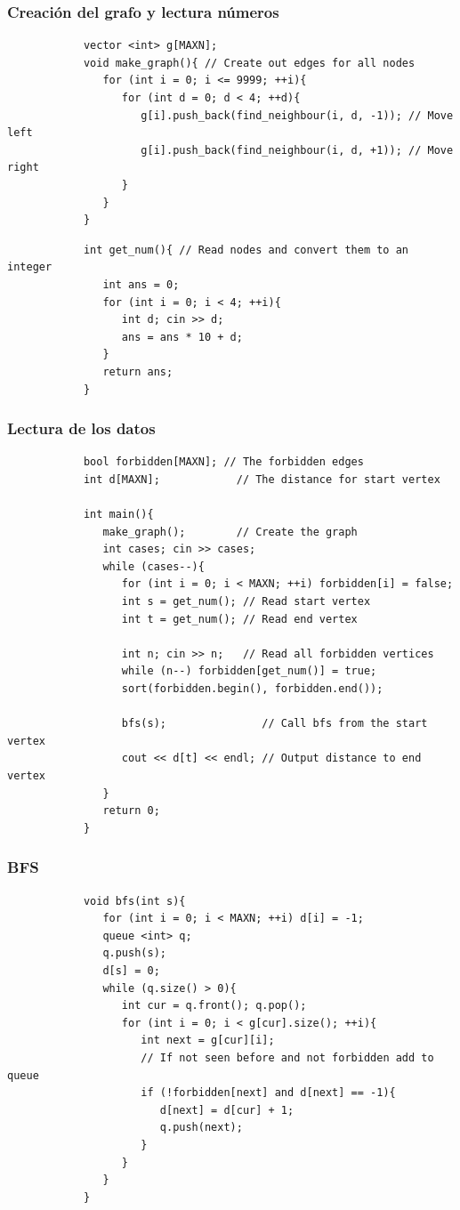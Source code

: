 \documentclass{beamer}
\begin{document}
	\begin{frame}[fragile]
		\frametitle{Creación del grafo y lectura números}
		\begin{lstlisting}
			vector <int> g[MAXN];
			void make_graph(){ // Create out edges for all nodes
			   for (int i = 0; i <= 9999; ++i){
			      for (int d = 0; d < 4; ++d){
			         g[i].push_back(find_neighbour(i, d, -1)); // Move left
			         g[i].push_back(find_neighbour(i, d, +1)); // Move right
			      }
			   }
			}
		\end{lstlisting}
		
		\begin{lstlisting}
			int get_num(){ // Read nodes and convert them to an integer
			   int ans = 0;
			   for (int i = 0; i < 4; ++i){
			      int d; cin >> d;
			      ans = ans * 10 + d;
			   }
			   return ans;
			}
		\end{lstlisting}
	\end{frame}
	
	\begin{frame}[fragile]
		\frametitle{Lectura de los datos}
		\begin{lstlisting}
			bool forbidden[MAXN]; // The forbidden edges
			int d[MAXN];            // The distance for start vertex

			int main(){
			   make_graph();        // Create the graph
			   int cases; cin >> cases;
			   while (cases--){
			      for (int i = 0; i < MAXN; ++i) forbidden[i] = false;
			      int s = get_num(); // Read start vertex
			      int t = get_num(); // Read end vertex

			      int n; cin >> n;   // Read all forbidden vertices
			      while (n--) forbidden[get_num()] = true;
			      sort(forbidden.begin(), forbidden.end());
		
			      bfs(s);               // Call bfs from the start vertex
			      cout << d[t] << endl; // Output distance to end vertex
			   }
			   return 0;
			}
		\end{lstlisting}
	\end{frame}
	
	\begin{frame}[fragile]
		\frametitle{BFS}
		\begin{lstlisting}
			void bfs(int s){
			   for (int i = 0; i < MAXN; ++i) d[i] = -1;
			   queue <int> q;
			   q.push(s);
			   d[s] = 0;
			   while (q.size() > 0){
			      int cur = q.front(); q.pop();
			      for (int i = 0; i < g[cur].size(); ++i){
			         int next = g[cur][i];
			         // If not seen before and not forbidden add to queue
			         if (!forbidden[next] and d[next] == -1){ 
			            d[next] = d[cur] + 1;
			            q.push(next);
			         }
			      }
			   }
			}
		\end{lstlisting}
	\end{frame}
\end{document}
